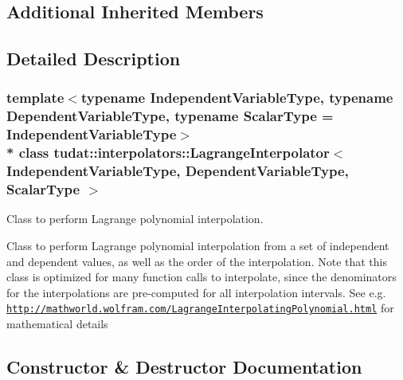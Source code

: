 \subsection*{Additional Inherited Members}


\subsection{Detailed Description}
\subsubsection*{template$<$typename Independent\+Variable\+Type, typename Dependent\+Variable\+Type, typename Scalar\+Type = Independent\+Variable\+Type$>$\\*
class tudat\+::interpolators\+::\+Lagrange\+Interpolator$<$ Independent\+Variable\+Type, Dependent\+Variable\+Type, Scalar\+Type $>$}

Class to perform Lagrange polynomial interpolation. 

Class to perform Lagrange polynomial interpolation from a set of independent and dependent values, as well as the order of the interpolation. Note that this class is optimized for many function calls to interpolate, since the denominators for the interpolations are pre-\/computed for all interpolation intervals. See e.\+g. \href{http://mathworld.wolfram.com/LagrangeInterpolatingPolynomial.html}{\tt http\+://mathworld.\+wolfram.\+com/\+Lagrange\+Interpolating\+Polynomial.\+html} for mathematical details 

\subsection{Constructor \& Destructor Documentation}
